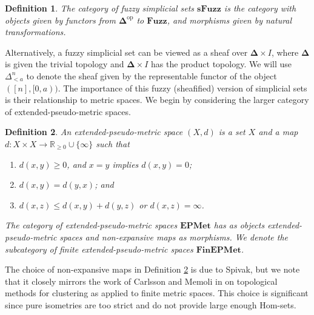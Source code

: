 \documentclass[12pt]{article}
\newtheorem{defn}{Definition}
\begin{document}
\begin{defn}
The category of \emph{fuzzy simplicial sets} $\mathbf{sFuzz}$ is the category with objects given by functors from $\boldsymbol\Delta^{\text{op}}$ to $\mathbf{Fuzz}$, and morphisms given by natural transformations.
\end{defn}

Alternatively, a fuzzy simplicial set can be viewed as a sheaf over $\boldsymbol\Delta \times I$, where $\boldsymbol\Delta$ is given the trivial topology and $\boldsymbol\Delta \times I$ has the product topology. We will use $\Delta^n_{<a}$ to denote the sheaf given by the representable functor of the object $([n], [0,a))$. The importance of this fuzzy (sheafified) version of simplicial sets is their relationship to metric spaces. We begin by considering the larger category of extended-pseudo-metric spaces.

\begin{defn}\label{defn:ex-pseu-met}
An \emph{extended-pseudo-metric space} $(X, d)$ is a set $X$ and a map $d: X\times X\to \mathbb{R}_{\geq 0}\cup\{\infty\}$ such that
\begin{enumerate}
    \item $d(x,y)\geqslant 0$, and $x=y$ implies $d(x,y)=0$;
    \item $d(x,y)=d(y,x)$; and
    \item $d(x,z)\leqslant d(x,y)+d(y,z)$ or $d(x,z)=\infty$.
\end{enumerate}
The category of extended-pseudo-metric spaces $\mathbf{EPMet}$ has as objects extended-pseudo-metric spaces and non-expansive maps as morphisms. We denote the subcategory of finite extended-pseudo-metric spaces $\mathbf{FinEPMet}$.
\end{defn}

The choice of non-expansive maps in Definition \ref{defn:ex-pseu-met} is due to Spivak, but we note that it closely mirrors the work of Carlsson and Memoli in \cite{carlsson2013classifying} on topological methods for clustering as applied to finite metric spaces. This choice is significant since pure isometries are too strict and do not provide large enough Hom-sets.
\end{document}
